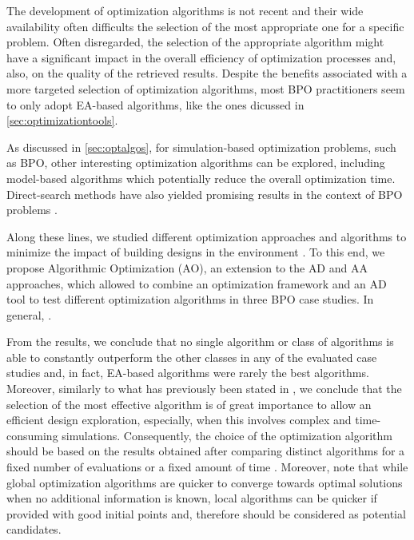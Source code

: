 The development of optimization algorithms is not recent and their wide availability often difficults the selection of the most appropriate one for a specific problem. Often disregarded, the selection of the appropriate algorithm might have a significant impact in the overall efficiency of optimization processes and, also, on the quality of the retrieved results\cite{Wolpert1997NFLT}. Despite the benefits associated with a more targeted selection of optimization algorithms, most \ac{BPO} practitioners seem to only adopt \ac{EA}-based algorithms, like the ones dicussed in \cref{sec:optimizationtools}. 

As discussed in \cref{sec:optalgos}, for simulation-based optimization problems, such as \ac{BPO}, other interesting optimization algorithms can be explored, including model-based algorithms which potentially reduce the overall optimization time\cite{Wortmann2017GABESTCHOICE}. Direct-search methods have also yielded promising results in the context of \ac{BPO} problems \cite{Waibel2018}. 

Along these lines, we studied different optimization approaches and algorithms to minimize the impact of building designs in the environment  \cite{Caetano2018,Belem2018optimizeddesign,Belem2019MOO}. To this end, we propose Algorithmic Optimization (\ac{AO}), an extension to the \ac{AD} and \ac{AA} approaches, which allowed to combine an optimization framework and an \ac{AD} tool to test different optimization algorithms in three \ac{BPO} case studies. In general, .

From the results, we conclude that no single algorithm or class of algorithms is able to constantly outperform the other classes in any of the evaluated case studies and, in fact, \ac{EA}-based algorithms were rarely the best algorithms. Moreover, similarly to what has previously been stated in \cite{Wortmann2016BBO}, we conclude that the selection of the most effective algorithm is of great importance to allow an efficient design exploration, especially, when this involves complex and time-consuming simulations. Consequently, the choice of the optimization algorithm should be based on the results obtained after comparing distinct algorithms for a fixed number of evaluations or a fixed amount of time \cite{Hamdy2016}. Moreover, note that while global optimization algorithms are quicker to converge towards optimal solutions when no additional information is known, local algorithms can be quicker if provided with good initial points and, therefore should be considered as potential candidates. 
 

